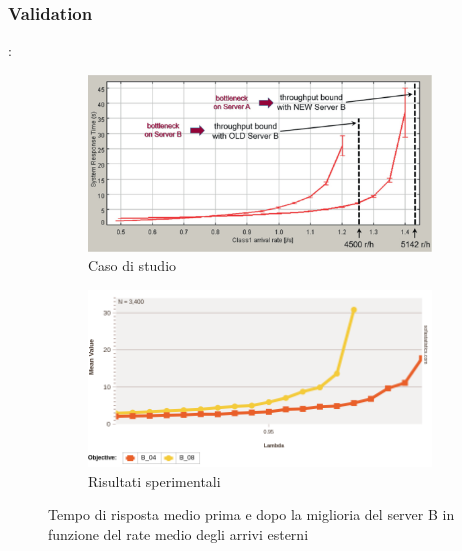 \subsubsection{Validation}
\begin{frame}{\subsecname: \subsubsecname}
    \begin{figure}
        \centering
        \begin{subfigure}[b]{0.49\textwidth}
            \centering
            \includegraphics[width=\columnwidth]{figs/results/obj4/obj4-validazione.jpg}
            \caption{Caso di studio \citep{DBLP:books/sp/Serazzi24}}
            \label{fig:obj4_validazione_casestudy}
        \end{subfigure}
        \begin{subfigure}[b]{0.49\textwidth}
            \centering
            \includegraphics[width=\columnwidth]{figs/results/obj4/obj4-simulazione-validazione.png}
            \caption{Risultati sperimentali}
            \label{fig:obj4_validazione_simulation}
        \end{subfigure}
        \hfill
        \caption{Tempo di risposta medio prima e dopo la miglioria del server B in funzione del rate medio degli arrivi esterni}
        \label{fig:obj4_validazione}
    \end{figure}
\end{frame}
